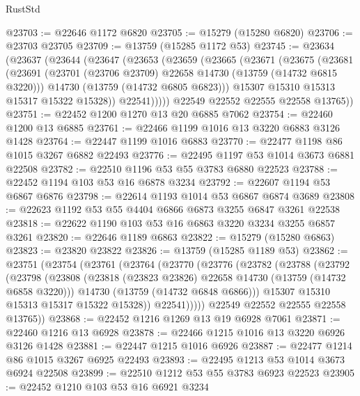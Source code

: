 \begin{lexlean}{RustStd}
\begin{coremodule}
@23703 := @22646 @1172 @6820
@23705 := @15279 (@15280 @6820)
@23706 := @23703 @23705
@23709 := @13759 (@15285 @1172 @53)
@23745 := @23634
    (@23637
      (@23644
        (@23647
          (@23653
            (@23659
              (@23665
                (@23671
                  (@23675
                    (@23681
                      (@23691
                        (@23701 (@23706 @23709) @22658 @14730 (@13759 (@14732 @6815 @3220)))
                        @14730
                        (@13759 (@14732 @6805 @6823)))
                      @15307
                      @15310
                      @15313
                      @15317
                      @15322
                      @15328))
                  @22541)))))
        @22549
        @22552
        @22555
        @22558
        @13765))
@23751 := @22452 @1200 @1270 @13 @20 @6885 @7062
@23754 := @22460 @1200 @13 @6885
@23761 := @22466 @1199 @1016 @13 @3220 @6883 @3126 @1428
@23764 := @22447 @1199 @1016 @6883
@23770 := @22477 @1198 @86 @1015 @3267 @6882 @22493
@23776 := @22495 @1197 @53 @1014 @3673 @6881 @22508
@23782 := @22510 @1196 @53 @55 @3783 @6880 @22523
@23788 := @22452 @1194 @103 @53 @16 @6878 @3234
@23792 := @22607 @1194 @53 @6867 @6876
@23798 := @22614 @1193 @1014 @53 @6867 @6874 @3689
@23808 := @22623 @1192 @53 @55 @4404 @6866 @6873 @3255 @6847 @3261 @22538
@23818 := @22622 @1190 @103 @53 @16 @6863 @3220 @3234 @3255 @6857 @3261
@23820 := @22646 @1189 @6863
@23822 := @15279 (@15280 @6863)
@23823 := @23820 @23822
@23826 := @13759 (@15285 @1189 @53)
@23862 := @23751
    (@23754
      (@23761
        (@23764
          (@23770
            (@23776
              (@23782
                (@23788
                  (@23792
                    (@23798
                      (@23808
                        (@23818 (@23823 @23826) @22658 @14730 (@13759 (@14732 @6858 @3220)))
                        @14730
                        (@13759 (@14732 @6848 @6866)))
                      @15307
                      @15310
                      @15313
                      @15317
                      @15322
                      @15328))
                  @22541)))))
        @22549
        @22552
        @22555
        @22558
        @13765))
@23868 := @22452 @1216 @1269 @13 @19 @6928 @7061
@23871 := @22460 @1216 @13 @6928
@23878 := @22466 @1215 @1016 @13 @3220 @6926 @3126 @1428
@23881 := @22447 @1215 @1016 @6926
@23887 := @22477 @1214 @86 @1015 @3267 @6925 @22493
@23893 := @22495 @1213 @53 @1014 @3673 @6924 @22508
@23899 := @22510 @1212 @53 @55 @3783 @6923 @22523
@23905 := @22452 @1210 @103 @53 @16 @6921 @3234

\end{coremodule}
\end{lexlean}
